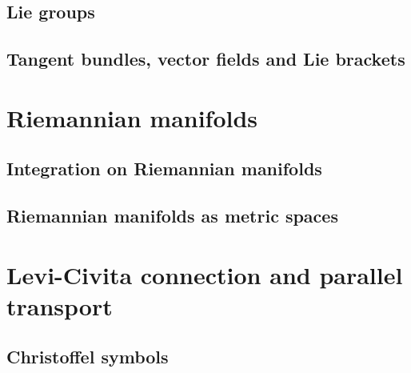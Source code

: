 \documentclass[letter-paper]{tufte-book}
\begin{document}

\section{Lie groups}


\section{Tangent bundles, vector fields and Lie brackets}


\chapter{Riemannian manifolds}


\section{Integration on Riemannian manifolds}


\section{Riemannian manifolds as metric spaces}


\chapter{Levi-Civita connection and parallel transport}


\section{Christoffel symbols}

\end{document}
